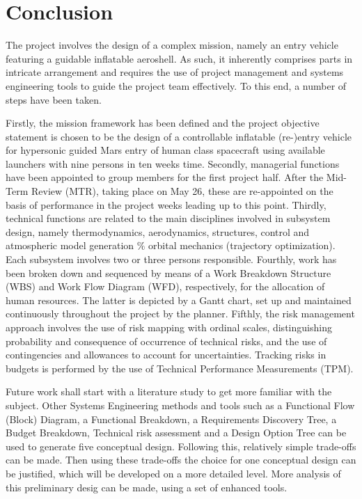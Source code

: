 \section{Conclusion}\label{cha:conclusion}
The project involves the design of a complex mission, namely an entry vehicle featuring a guidable inflatable aeroshell. As such, it inherently comprises parts in intricate arrangement and requires the use of project management and systems engineering tools to guide the project team effectively. To this end, a number of steps have been taken. 

Firstly, the mission framework has been defined and the project objective statement is chosen to be the design of a controllable inflatable (re-)entry vehicle for hypersonic guided Mars entry of human class spacecraft using available launchers with nine persons in ten weeks time.  Secondly, managerial functions have been appointed to group members for the first project half. After the Mid-Term Review (MTR), taking place on May 26, these are re-appointed on the basis of performance in the project weeks leading up to this point. Thirdly, technical functions are related to the main disciplines involved in subsystem design, namely thermodynamics, aerodynamics, structures, control and atmospheric model generation $\%$ orbital mechanics (trajectory optimization). Each subsystem involves two or three persons responsible. Fourthly, work has been broken down  and sequenced by means of a Work Breakdown Structure (WBS) and Work Flow Diagram (WFD), respectively, for the allocation of human resources. The latter is depicted by a Gantt chart, set up and maintained continuously throughout the project by the planner. Fifthly, the risk management approach involves the use of risk mapping with ordinal scales, distinguishing probability and consequence of occurrence of technical risks, and the use of contingencies and allowances to account for uncertainties. Tracking risks in budgets is performed by the use of Technical Performance Measurements (TPM).

Future work shall start with a literature study to get more familiar with the subject. Other Systems Engineering methods and tools such as a Functional Flow (Block) Diagram, a Functional Breakdown, a Requirements Discovery Tree, a Budget Breakdown, Technical risk assessment and a Design Option Tree can be used to generate five conceptual design. Following this, relatively simple trade-offs can be made. Then using these trade-offs the choice for one conceptual design can be justified, which will be developed on a more detailed level. More analysis of this preliminary desig can be made, using a set of enhanced tools. 
